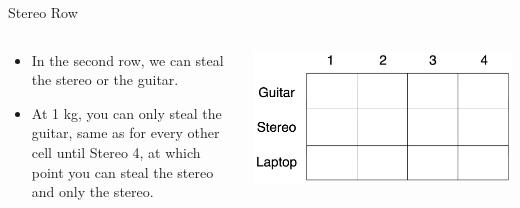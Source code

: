 \documentclass[
  ignorenonframetext,
]{beamer}
\begin{document}
\begin{frame}{Stereo Row}
\protect\hypertarget{stereo-row}{}
\begin{columns}[T]
\begin{column}{0.5\textwidth}
\begin{itemize}
\item
  In the second row, we can steal the stereo or the guitar.
\item
  At 1 kg, you can only steal the guitar, same as for every other cell
  until Stereo 4, at which point you can steal the stereo and only the
  stereo.
\end{itemize}
\end{column}

\begin{column}{0.5\textwidth}
\includegraphics{images/dynamic.png}
\end{column}
\end{columns}
\end{frame}
\end{document}
